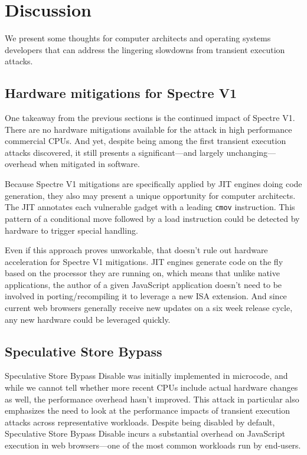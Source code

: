 \section{Discussion}
\label{s:discussion}

We present some thoughts for computer architects and
operating systems developers that can address the lingering slowdowns from transient execution attacks.

\subsection{Hardware mitigations for Spectre V1}

One takeaway from the previous sections is the continued impact of Spectre V1.
There are no hardware mitigations available for the attack in high performance commercial CPUs.
And yet, despite being among the first transient execution attacks discovered, it still presents a significant---and largely unchanging---overhead when mitigated in software.

Because Spectre V1 mitigations are specifically applied by JIT engines doing code generation, they also may present a unique opportunity for computer architects.
The JIT annotates each vulnerable gadget with a leading \texttt{cmov} instruction.
This pattern of a conditional move followed by a load instruction could be detected by hardware to trigger special handling.

Even if this approach proves unworkable, that doesn't rule out hardware acceleration for Spectre V1 mitigations.
JIT engines generate code on the fly based on the processor they are running on, which means that unlike native applications, the author of a given JavaScript application doesn't need to be involved in porting/recompiling it to leverage a new ISA extension.
And since current web browsers generally receive new updates on a six
week release cycle, any new hardware could be leveraged quickly.

\subsection{Speculative Store Bypass}

Speculative Store Bypass Disable was initially implemented in microcode, and while we cannot tell whether more recent CPUs include actual hardware changes as well, the performance overhead hasn't improved.
This attack in particular also emphasizes the need to look at the performance impacts of transient execution attacks across representative workloads.
Despite being disabled by default, Speculative Store Bypass Disable incurs a substantial overhead on JavaScript execution in web browsers---one of the most common workloads run by end-users.


